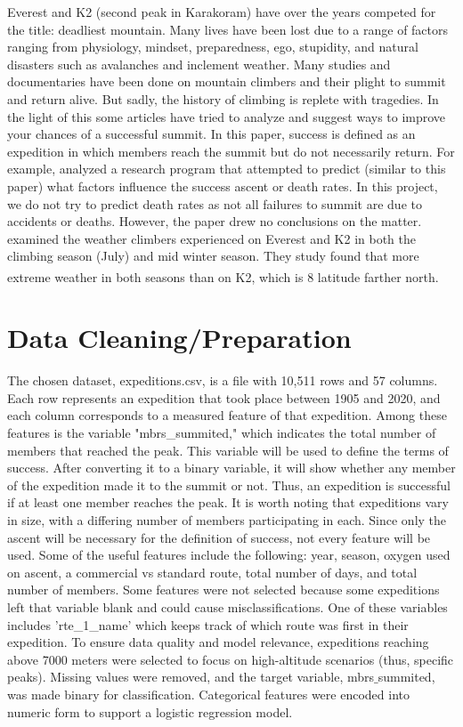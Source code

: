 \documentclass[stu,12pt,floatsintext]{apa7}
\begin{document}
Everest and K2 (second peak in Karakoram) have over the years competed for the title: deadliest mountain. Many lives have been lost due to a range of factors ranging from physiology, mindset, preparedness, ego, stupidity, and natural disasters such as avalanches and inclement weather. Many studies and documentaries have been done on mountain climbers and their plight to summit and return alive. But sadly, the history of climbing is replete with tragedies. In the light of this some articles have tried to analyze and suggest ways to improve your chances of a successful summit. In this paper, success is defined as an expedition in which members reach the summit but do not necessarily return. For example, \textcite{hueymountaineering2001} analyzed a research program that attempted to predict (similar to this paper) what factors influence the success ascent or death rates. In this project, we do not try to predict death rates as not all failures to summit are due to accidents or deaths. However, the paper drew no conclusions on the matter. \textcite{szymczakcomparison2021} examined the weather climbers experienced on Everest and K2 in both the climbing season (July) and mid winter season. They study found that more extreme weather in both seasons than on K2, which is \si{8^{\circ}} latitude farther north.

\pagebreak

\section{Data Cleaning/Preparation}
The chosen dataset, expeditions.csv, is a file with 10,511 rows and 57 columns. Each row represents an expedition that took place between 1905 and 2020, and each column corresponds to a measured feature of that expedition. Among these features is the variable "mbrs\_summited," which indicates the total number of members that reached the peak. This variable will be used to define the terms of success. After converting it to a binary variable, it will show whether any member of the expedition made it to the summit or not. Thus, an expedition is successful if at least one member reaches the peak. It is worth noting that expeditions vary in size, with a differing number of members participating in each. Since only the ascent will be necessary for the definition of success, not every feature will be used. Some of the useful features include the following: year, season, oxygen used on ascent, a commercial vs standard route, total number of days, and total number of members. Some features were not selected because some expeditions left that variable blank and could cause misclassifications. One of these variables includes 'rte\_1\_name' which keeps track of which route was first in their expedition. To ensure data quality and model relevance, expeditions reaching above 7000 meters were selected to focus on high-altitude scenarios (thus, specific peaks). Missing values were removed, and the target variable, mbrs$\_$summited, was made binary for classification. Categorical features were encoded into numeric form to support a logistic regression model.
\end{document}
